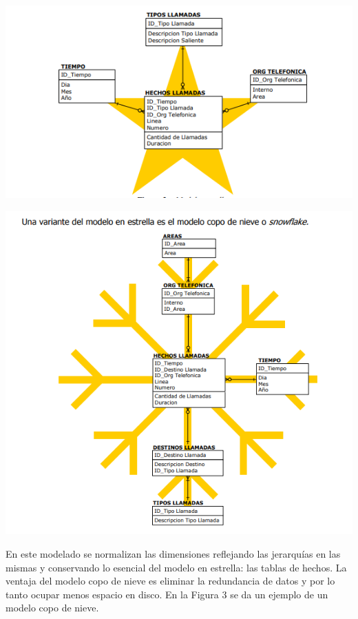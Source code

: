 \begin{center}
\includegraphics{images/BS/imagen 03.png}\newline
\end{center}

\begin{center}
\includegraphics{images/BS/imagen 04.png}\newline
\end{center}



En este modelado se normalizan las dimensiones reflejando las jerarquías en las mismas y conservando lo esencial del modelo en estrella: las tablas de hechos. La ventaja del modelo copo de nieve es eliminar la redundancia de datos y por lo tanto ocupar menos espacio en disco. En la Figura 3 se da un ejemplo de un modelo copo de nieve. \newline 




